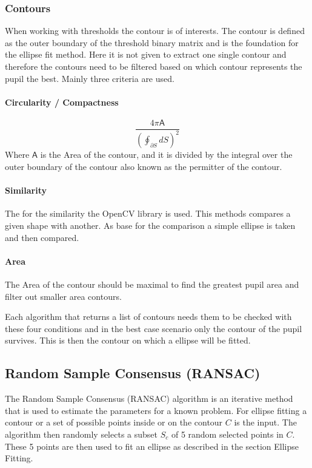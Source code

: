 \subsubsection{Contours}
    When working with thresholds the contour is of interests. The contour is defined as the outer boundary of the threshold binary matrix and is the foundation for the ellipse fit method. 
    Here it is not given to extract one single contour and therefore the contours need to be filtered based on which contour represents the pupil the best. 
    Mainly three criteria are used. 
    
    \paragraph{Circularity / Compactness}
    \begin{equation}
        \frac{4\pi\mathsf{A} }{(\oint_{\partial S} dS)^2}
    \end{equation}
    Where $\mathsf{A} $ is the Area of the contour, and it is divided by the integral over the outer boundary of the contour also known as the permitter of the contour.

    \paragraph{Similarity }
    The for the similarity the OpenCV library is used. This methods compares a given shape with another. As base for the comparison a simple ellipse is taken and then compared.

    \paragraph{Area}
    The Area of the contour should be maximal to find the greatest pupil area and filter out smaller area contours. 

   Each algorithm that returns a list of contours needs them to be checked with these four conditions and in the best case scenario only the contour of the pupil survives. This is then the contour on which a ellipse will be fitted. 

\newpage
\subsection{Random Sample Consensus (RANSAC) }
\label{sus:ransac}
The Random Sample Consensus (RANSAC)\cite{derpanis_overview_nodate} algorithm is an iterative method that is used to estimate the parameters for a known problem. For ellipse fitting a contour or a set of possible points inside or on the contour $C$ is the input. The algorithm then randomly selects a subset $S_c$ of 5 random selected points in $C$. 
These 5 points are then used to fit an ellipse as described in the section Ellipse Fitting.

